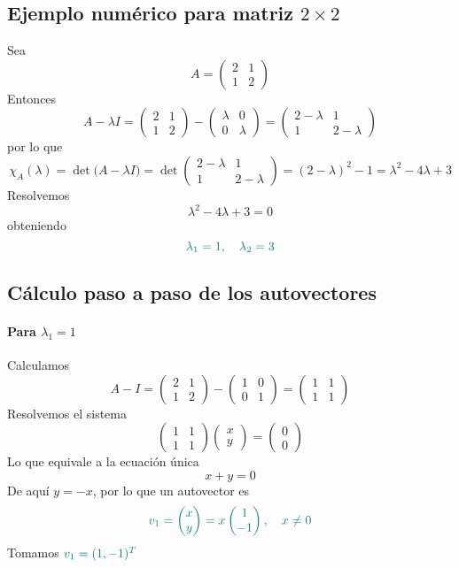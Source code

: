 \documentclass{article}
\begin{document}
\subsection*{Ejemplo numérico para matriz \(2\times2\)}
Sea
\[
A = \begin{pmatrix}
 2 & 1\\
 1 & 2
\end{pmatrix}
\]
Entonces
\[
A - \lambda I
= \begin{pmatrix}
 2 & 1\\
 1 & 2
\end{pmatrix}
- \begin{pmatrix}
 \lambda & 0\\
 0 & \lambda
\end{pmatrix}
= \begin{pmatrix}
 2-\lambda & 1\\
 1 & 2-\lambda
\end{pmatrix}
\]
por lo que
\[
\chi_A(\lambda)
= \det\bigl(A - \lambda I\bigr)
= \det\begin{pmatrix}
 2-\lambda & 1\\
 1 & 2-\lambda
\end{pmatrix}
= (2-\lambda)^2 - 1
= \lambda^2 - 4\lambda + 3
\]
Resolvemos
\[
\lambda^2 - 4\lambda + 3 = 0
\]
obteniendo
\[\color{teal}
\lambda_1 = 1,
\quad
\lambda_2 = 3
\]
\subsection*{Cálculo paso a paso de los autovectores}

\paragraph*{Para \(\lambda_1 = 1\)}
Calculamos
\[
A - I = \begin{pmatrix}
 2 & 1\\
 1 & 2
\end{pmatrix}
- \begin{pmatrix}
 1 & 0\\
 0 & 1
\end{pmatrix}
= \begin{pmatrix}
 1 & 1\\
 1 & 1
\end{pmatrix}
\]
Resolvemos el sistema
\[
\begin{pmatrix}
 1 & 1\\
 1 & 1
\end{pmatrix}
\begin{pmatrix}x\\y\end{pmatrix}
= \begin{pmatrix}0\\0\end{pmatrix}
\]
Lo que equivale a la ecuación única
\[
x + y = 0
\]
De aquí \(y = -x\), por lo que un autovector es
\[ \color{teal}
v_1 = \begin{pmatrix}x\\y\end{pmatrix}
= x\begin{pmatrix}1\\-1\end{pmatrix},
\quad x\neq 0
\]
Tomamos \(\color{teal}v_1 = (1,-1)^T\)
\end{document}
